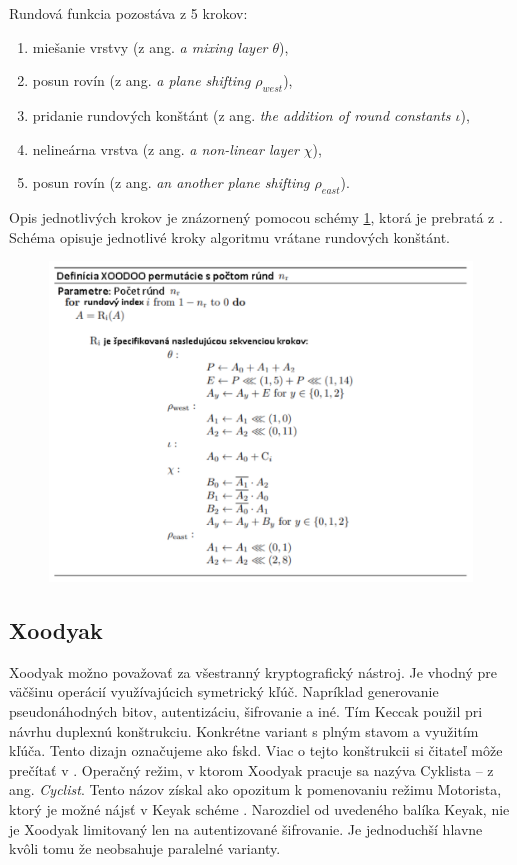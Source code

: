 Rundová funkcia pozostáva z 5 krokov:
\begin{enumerate}
	\item miešanie vrstvy (z ang. \textit{a mixing layer $\theta$}), 
	\item posun rovín (z ang. \textit{a plane shifting $\rho_{west}$}), 
	\item pridanie rundových konštánt (z ang. \textit{the addition of round constants $\iota$}),
	\item nelineárna vrstva (z ang. \textit{a non-linear layer $\chi$}),
	\item posun rovín (z ang. \textit{an another plane shifting $\rho_{east}$}).
\end{enumerate}
Opis jednotlivých krokov je znázornený pomocou schémy \ref{xoodooalgo}, ktorá je prebratá z \cite{xcb}. Schéma opisuje jednotlivé kroky algoritmu vrátane rundových konštánt. 

  \begin{figure}[!h]
  	\centering
  	\includegraphics[width=1.1\textwidth]{figures/xoodooalgo}
  	\caption{}
  	\label{xoodooalgo}
  \end{figure}

\subsection{Xoodyak} 
Xoodyak možno považovať za všestranný kryptografický nástroj. Je vhodný pre väčšinu operácií využívajúcich symetrický kľúč. Napríklad generovanie pseudonáhodných bitov, autentizáciu, šifrovanie a iné. Tím Keccak použil pri návrhu duplexnú konštrukciu. Konkrétne variant s plným stavom a využitím kľúča. Tento dizajn označujeme ako \acrfull{fskd}. Viac o tejto konštrukcii si čitateľ môže prečítať v \cite{duplex}.
Operačný režim, v ktorom Xoodyak pracuje sa nazýva Cyklista -- z ang. \textit{Cyclist}. Tento názov získal ako opozitum k pomenovaniu režimu Motorista, ktorý je možné nájsť v Keyak schéme \cite{keyak}. Narozdiel od uvedeného balíka Keyak, nie je Xoodyak limitovaný len na autentizované šifrovanie. Je jednoduchší hlavne kvôli tomu že neobsahuje paralelné varianty.

